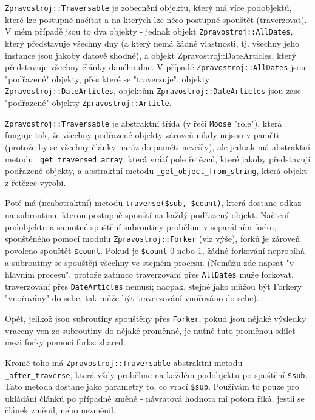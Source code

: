 \documentclass[12pt,a4paper]{report}
\begin{document}
\texttt{Zpravostroj::Traversable} je zobecnění objektu, který má více podobjektů, které lze postupně načítat a na kterých lze něco postupně spouštět (traverzovat). V mém případě jsou to dva objekty - jednak objekt \texttt{Zpravostroj::AllDates}, který představuje všechny dny (a který nemá žádné vlastnosti, tj. všechny jeho instance jsou jakoby datově shodné), a objekt Zpravostroj::DateArticles, který představuje všechny články daného dne. V případě \texttt{Zpravostroj::AllDates} jsou "podřazené" objekty, přes které se "traverzuje", objekty \texttt{Zpravostroj::DateArticles}, objektům \texttt{Zpravostroj::DateArticles} jsou zase "podřazené" objekty \texttt{Zpravostroj::Article}.

\texttt{Zpravostroj::Traversable} je abstraktní třída (v řeči \texttt{Moose} "role"), která funguje tak, že všechny podřazené objekty zároveň nikdy nejsou v paměti (protože by se všechny články naráz do paměti nevešly), ale jednak má abstraktní metodu \texttt{\_get\_traversed\_array}, která vrátí pole řetězců, které jakoby představují podřazené objekty, a abstraktní metodu \texttt{\_get\_object\_from\_string}, která objekt z řetězce vyrobí.

Poté má (neabstraktní) metodu \texttt{traverse(\$sub, \$count)}, která dostane odkaz na subroutinu, kterou postupně spouští na každý podřazený objekt. Načtení podobjektu a samotné spuštění subroutiny proběhne v separátním forku, spouštěného pomocí modulu \texttt{Zpravostroj::Forker} (viz výše), forků je zároveň povoleno spouštět \texttt{\$count}. Pokud je \texttt{\$count} 0 nebo 1, žádné forkování neprobíhá a subroutiny se spouštějí všechny ve stejném procesu. (Nemůžu zde napsat "v hlavním procesu", protože zatímco traverzování přes \texttt{AllDates} může forkovat, traverzování přes \texttt{DateArticles} nemusí; naopak, stejně jako můžou být Forkery "vnořovány" do sebe, tak může být traverzování vnořováno do sebe).

Opět, jelikož jsou subroutiny spouštěny přes \texttt{Forker}, pokud jsou nějaké výsledky vraceny ven ze subroutiny do nějaké proměnné, je nutné tuto proměnou sdílet mezi forky pomocí forks::shared.

Kromě toho má \texttt{Zpravostroj::Traversable} abstraktní metodu \texttt{\_after\_traverse}, která vždy proběhne na každém podobjektu po spuštění \texttt{\$sub}. Tato metoda dostane jako parametry to, co vrací \texttt{\$sub}. Používám to pouze pro ukládání článků po případné změně - návratová hodnota mi potom říká, jestli se článek změnil, nebo nezměnil.
\end{document}
